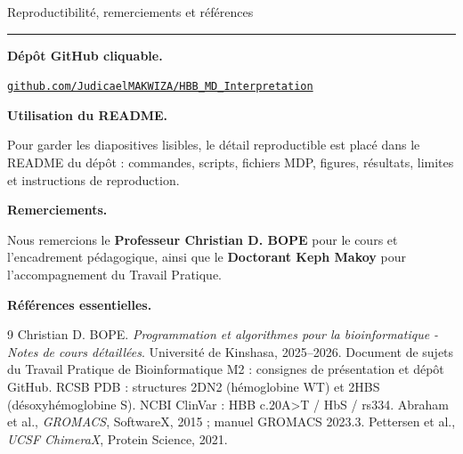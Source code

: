 \documentclass[aspectratio=169,10pt]{beamer}
\newcommand{\slidetitleline}{\par\vspace{-0.3em}\noindent\textcolor{UniBlue}{\rule{\linewidth}{0.7pt}}\par\vspace{0.25em}}
\begin{document}
\begin{frame}[shrink=4]{Reproductibilité, remerciements et références}
\slidetitleline
\small
\textbf{Dépôt GitHub cliquable.}\par
\href{https://github.com/JudicaelMAKWIZA/HBB_MD_Interpretation}{\texttt{github.com/JudicaelMAKWIZA/HBB\_MD\_Interpretation}}

\vspace{0.45em}
\textbf{Utilisation du README.}\par
\footnotesize
Pour garder les diapositives lisibles, le détail reproductible est placé dans le README du dépôt : commandes, scripts, fichiers MDP, figures, résultats, limites et instructions de reproduction.

\vspace{0.45em}
\textbf{Remerciements.}\par
\footnotesize
Nous remercions le \textbf{Professeur Christian D. BOPE} pour le cours et l'encadrement pédagogique, ainsi que le \textbf{Doctorant Keph Makoy} pour l'accompagnement du Travail Pratique.

\vspace{0.45em}
\textbf{Références essentielles.}\par
\scriptsize
\begin{thebibliography}{9}
 Christian D. BOPE. \textit{Programmation et algorithmes pour la bioinformatique - Notes de cours détaillées}. Université de Kinshasa, 2025--2026.
 Document de sujets du Travail Pratique de Bioinformatique M2 : consignes de présentation et dépôt GitHub.
 RCSB PDB : structures 2DN2 (hémoglobine WT) et 2HBS (désoxyhémoglobine S).
 NCBI ClinVar : HBB c.20A>T / HbS / rs334.
 Abraham et al., \textit{GROMACS}, SoftwareX, 2015 ; manuel GROMACS 2023.3.
 Pettersen et al., \textit{UCSF ChimeraX}, Protein Science, 2021.
\end{thebibliography}
\end{frame}
\end{document}
